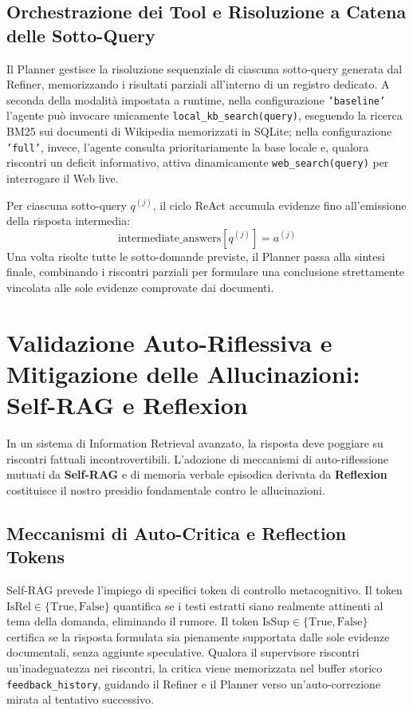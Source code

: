 \subsection{Orchestrazione dei Tool e Risoluzione a Catena delle Sotto-Query}
Il Planner gestisce la risoluzione sequenziale di ciascuna sotto-query generata dal Refiner, memorizzando i risultati parziali all'interno di un registro dedicato. A seconda della modalità impostata a runtime, nella configurazione \texttt{'baseline'} l'agente può invocare unicamente \texttt{local\_kb\_search(query)}, eseguendo la ricerca BM25 sui documenti di Wikipedia memorizzati in SQLite; nella configurazione \texttt{'full'}, invece, l'agente consulta prioritariamente la base locale e, qualora riscontri un deficit informativo, attiva dinamicamente \texttt{web\_search(query)} per interrogare il Web live.

Per ciascuna sotto-query $q^{(j)}$, il ciclo ReAct accumula evidenze fino all'emissione della risposta intermedia:
\begin{equation}
\text{intermediate\_answers}[q^{(j)}] = a^{(j)}
\end{equation}
Una volta risolte tutte le sotto-domande previste, il Planner passa alla sintesi finale, combinando i riscontri parziali per formulare una conclusione strettamente vincolata alle sole evidenze comprovate dai documenti.

\section{Validazione Auto-Riflessiva e Mitigazione delle Allucinazioni: Self-RAG e Reflexion}
\label{sec:self_rag}

In un sistema di Information Retrieval avanzato, la risposta deve poggiare su riscontri fattuali incontrovertibili. L'adozione di meccanismi di auto-riflessione mutuati da \textbf{Self-RAG} \cite{asai2023selfrag} e di memoria verbale episodica derivata da \textbf{Reflexion} \cite{shinn2023reflexion} costituisce il nostro presidio fondamentale contro le allucinazioni.

\subsection{Meccanismi di Auto-Critica e Reflection Tokens}
Self-RAG prevede l'impiego di specifici token di controllo metacognitivo. Il token $\text{IsRel} \in \{\text{True}, \text{False}\}$ quantifica se i testi estratti siano realmente attinenti al tema della domanda, eliminando il rumore. Il token $\text{IsSup} \in \{\text{True}, \text{False}\}$ certifica se la risposta formulata sia pienamente supportata dalle sole evidenze documentali, senza aggiunte speculative. Qualora il supervisore riscontri un'inadeguatezza nei riscontri, la critica viene memorizzata nel buffer storico \texttt{feedback\_history}, guidando il Refiner e il Planner verso un'auto-correzione mirata al tentativo successivo.

